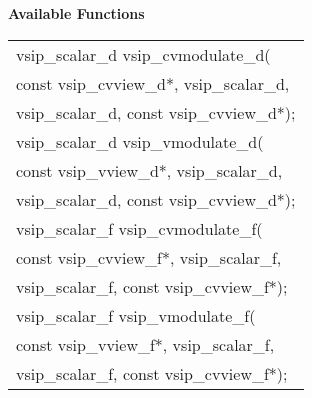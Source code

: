 \\\cvsiplh
\\ \hspace*{.8cm} \vspace*{.1cm} \textbf{Available Functions }
\\ \hspace*{1.1cm} {
\ttfamily
\begin{tabular}[H]{l}
vsip\_scalar\_d vsip\_cvmodulate\_d(\\*\hspace{.6cm}const vsip\_cvview\_d*, vsip\_scalar\_d, \\*\hspace{.6cm}vsip\_scalar\_d, const vsip\_cvview\_d*);\\
vsip\_scalar\_d vsip\_vmodulate\_d(\\*\hspace{.6cm}const vsip\_vview\_d*, vsip\_scalar\_d, \\*\hspace{.6cm}vsip\_scalar\_d, const vsip\_cvview\_d*);\\
vsip\_scalar\_f vsip\_cvmodulate\_f(\\*\hspace{.6cm}const vsip\_cvview\_f*, vsip\_scalar\_f, \\*\hspace{.6cm}vsip\_scalar\_f, const vsip\_cvview\_f*);\\
vsip\_scalar\_f vsip\_vmodulate\_f(\\*\hspace{.6cm}const vsip\_vview\_f*, vsip\_scalar\_f, \\*\hspace{.6cm}vsip\_scalar\_f, const vsip\_cvview\_f*);\\
\end{tabular}
}
\\\pyjvsiph
{}
